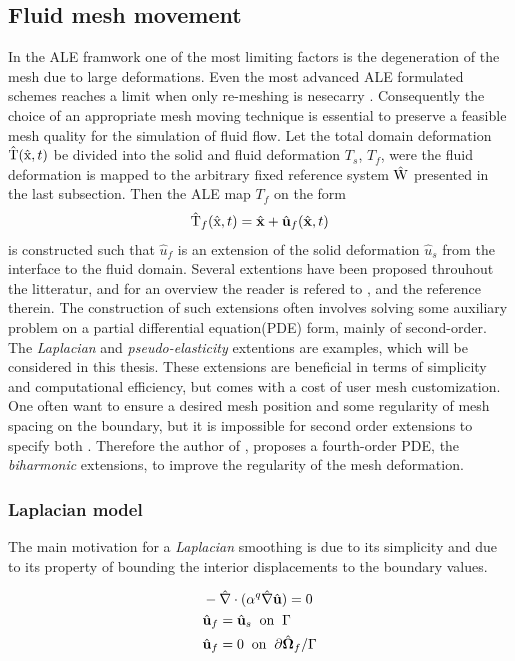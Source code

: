 \subsection*{Fluid mesh movement}
In the ALE framwork one of the most limiting factors is the degeneration of the mesh due to large deformations. Even the most advanced ALE formulated schemes reaches a limit when only re-meshing is nesecarry \cite{Wall12006}. Consequently the choice of an appropriate mesh moving technique is essential to preserve a feasible mesh quality for the simulation of fluid flow. Let the total domain deformation $\text{\^{T}}(\text{\^{x}}, t)$ be divided into the solid and fluid deformation $T_s$, $T_f$, were the fluid deformation is mapped to the arbitrary fixed reference system $\text{\^{W}}$ presented in the last subsection.  
Then the ALE map $T_f$ on the form 
\begin{align*}
\ha{T}_f(\ha{x}, t) = \hat{x} + \hat{u}_f(\hat{x}, t)
\end{align*}
is constructed such that $\hat{u}_f$ is an extension of the solid deformation $\hat{u}_s$ from the interface to the fluid domain. Several extentions have been proposed throuhout the litteratur, and for an overview the reader is refered to \cite{MM2016}, and the reference therein. The construction of such extensions often involves solving some auxiliary problem on a partial differential equation(PDE) form, mainly of second-order. The \textit{Laplacian} and \textit{pseudo-elasticity} extentions are examples, which will be considered in this thesis. These extensions are beneficial in terms of simplicity and computational efficiency, but comes with a cost of user mesh customization. One often want to ensure a desired mesh position and some regularity of mesh spacing on the boundary, but it is impossible for second order extensions to specify both \cite{Helenbrook2003}. Therefore the author of \cite{Helenbrook2003}, proposes a fourth-order PDE, the \textit{biharmonic} extensions, to improve the regularity of the mesh deformation. \\

\subsubsection*{Laplacian model}

The main motivation for a \textit{Laplacian} smoothing is due to its simplicity and due to its property of bounding the interior displacements to the boundary values. 

\begin{align*}
&- \hat{\nabla} \cdot (\alpha^q \hat{\nabla} \hat{u}) = 0 \\
&\hat{u}_f = \hat{u}_s \hspace{2mm} \text{on} \hspace{2mm}  \Gamma \\
&\hat{u}_f = 0 \hspace{2mm} \text{on} \hspace{2mm} \partial \hat{\Omega}_f / \Gamma 
\end{align*}

